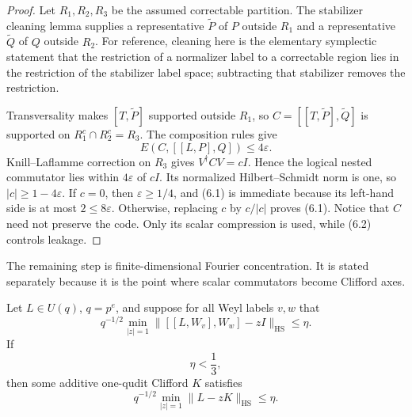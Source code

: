 \begin{proof}
Let \(R_1,R_2,R_3\) be the assumed correctable partition.  The stabilizer
cleaning lemma supplies a representative \(\widetilde P\) of \(P\) outside
\(R_1\) and a representative \(\widetilde Q\) of \(Q\) outside \(R_2\).
For reference, cleaning here is the elementary symplectic statement that
the restriction of a normalizer label to a correctable region lies in the
restriction of the stabilizer label space; subtracting that stabilizer
removes the restriction.

Transversality makes \([T,\widetilde P]\) supported outside \(R_1\), so
\(C=[[T,\widetilde P],\widetilde Q]\) is supported on
\(R_1^c\cap R_2^c=R_3\).  The composition rules give
\[
 E(C,[[L,P],Q])\leq4\varepsilon.                      \tag{6.2}
\]
Knill--Laflamme correction on \(R_3\) gives
\(V^\dagger C V=cI\).  Hence the logical nested commutator lies within
\(4\varepsilon\) of \(cI\).  Its normalized Hilbert--Schmidt norm is one,
so \(|c|\geq1-4\varepsilon\).  If \(c=0\), then \(\varepsilon\geq1/4\), and
(6.1) is immediate because its left-hand side is at most
\(2\leq8\varepsilon\).  Otherwise, replacing \(c\) by \(c/|c|\) proves (6.1).
Notice that \(C\) need not preserve the code.  Only its scalar compression
is used, while (6.2) controls leakage.
\end{proof}

The remaining step is finite-dimensional Fourier concentration.  It is
stated separately because it is the point where scalar commutators become
Clifford axes.

\begin{lemma}
\label{lem:nested-weyl-rounding}
Let \(L\in U(q)\), \(q=p^e\), and suppose for all Weyl labels \(v,w\)
that
\[
 q^{-1/2}\min_{|z|=1}
 \lVert [[L,W_v],W_w]-zI\rVert_{\mathrm{HS}}\leq\eta.
\]
If
\[
 \eta<\frac13,
\]
then some additive one-qudit Clifford \(K\) satisfies
\[
 q^{-1/2}\min_{|z|=1}\lVert L-zK\rVert_{\mathrm{HS}}\leq\eta.
\]
\end{lemma}

